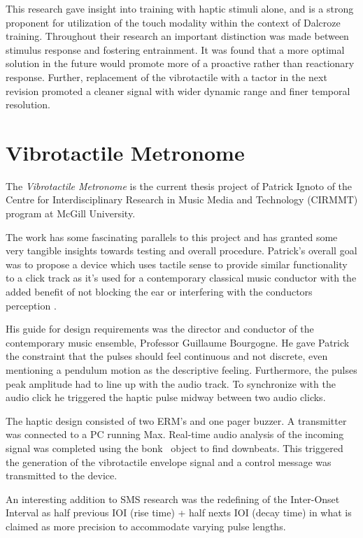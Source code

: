 This research gave insight into training with haptic stimuli alone, and is a strong proponent for utilization of the touch modality within the context of Dalcroze training. Throughout their research an important distinction was made between stimulus response and fostering entrainment. It was found that a more optimal solution in the future would promote more of a proactive rather than reactionary response. Further, replacement of the vibrotactile with a tactor in the next revision promoted a cleaner signal with wider dynamic range and finer temporal resolution.

\section{Vibrotactile Metronome} \label{vibrotactileMetronome}
The \textit{Vibrotactile Metronome} is the current thesis project of Patrick Ignoto of the Centre for Interdisciplinary Research in Music Media and Technology (CIRMMT) program at McGill University.

The work has some fascinating parallels to this project and has granted some very tangible insights towards testing and overall procedure. Patrick’s overall goal was to propose a device which uses tactile sense to provide similar functionality to a click track as it’s used for a contemporary classical music conductor with the added benefit of not blocking the ear or interfering with the conductors perception \cite{ignoto2017development}.

His guide for design requirements was the director and conductor of the contemporary music ensemble, Professor Guillaume Bourgogne. He gave Patrick the constraint that the pulses should feel continuous and not discrete, even mentioning a pendulum motion as the descriptive feeling. Furthermore, the pulses peak amplitude had to line up with the audio track. To synchronize with the audio click he triggered the haptic pulse midway between two audio clicks.

The haptic design consisted of two ERM’s and one pager buzzer. A transmitter was connected to a PC running Max. Real-time audio analysis of the incoming signal was completed using the bonk~ object to find downbeats. This triggered the generation of the vibrotactile envelope signal and a control message was transmitted to the device.

An interesting addition to SMS research was the redefining of the Inter-Onset Interval as half previous IOI (rise time) + half nexts IOI (decay time) in what is claimed as more precision to accommodate varying pulse lengths.

